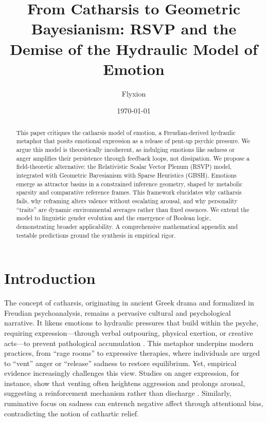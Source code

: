 \documentclass[11pt]{article}
\title{From Catharsis to Geometric Bayesianism: RSVP and the Demise of the Hydraulic Model of Emotion}
\author{Flyxion}
\date{\today}
\theoremstyle{plain}
\begin{document}
\maketitle

\begin{abstract}
This paper critiques the catharsis model of emotion, a Freudian-derived hydraulic metaphor that posits emotional expression as a release of pent-up psychic pressure. We argue this model is theoretically incoherent, as indulging emotions like sadness or anger amplifies their persistence through feedback loops, not dissipation. We propose a field-theoretic alternative: the Relativistic Scalar Vector Plenum (RSVP) model, integrated with Geometric Bayesianism with Sparse Heuristics (GBSH). Emotions emerge as attractor basins in a constrained inference geometry, shaped by metabolic sparsity and comparative reference frames. This framework elucidates why catharsis fails, why reframing alters valence without escalating arousal, and why personality “traits” are dynamic environmental averages rather than fixed essences. We extend the model to linguistic gender evolution and the emergence of Boolean logic, demonstrating broader applicability. A comprehensive mathematical appendix and testable predictions ground the synthesis in empirical rigor.
\end{abstract}

\section{Introduction}

The concept of catharsis, originating in ancient Greek drama and formalized in Freudian psychoanalysis, remains a pervasive cultural and psychological narrative. It likens emotions to hydraulic pressures that build within the psyche, requiring expression—through verbal outpouring, physical exertion, or creative acts—to prevent pathological accumulation \citep{Douglas1966}. This metaphor underpins modern practices, from “rage rooms” to expressive therapies, where individuals are urged to “vent” anger or “release” sadness to restore equilibrium. Yet, empirical evidence increasingly challenges this view. Studies on anger expression, for instance, show that venting often heightens aggression and prolongs arousal, suggesting a reinforcement mechanism rather than discharge \citep{Brown1988}. Similarly, ruminative focus on sadness can entrench negative affect through attentional bias, contradicting the notion of cathartic relief.
\end{document}
